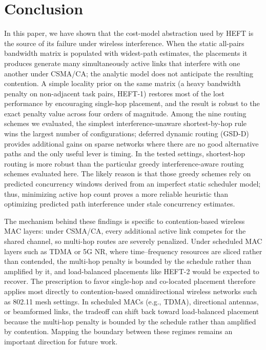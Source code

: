 \documentclass[conference]{IEEEtran}
\newcommand{\heftone}{HEFT-1}
\newcommand{\hefttwo}{HEFT-2}
\begin{document}
\section{Conclusion}
\label{sec:conclusion}

In this paper, we have shown that the cost-model abstraction used by HEFT
is the source of its failure under wireless interference. When the static
all-pairs bandwidth matrix is populated with widest-path estimates, the
placements it produces generate many simultaneously active links that
interfere with one another under CSMA/CA; the analytic model does not
anticipate the resulting contention. A simple
locality prior on the same matrix (a heavy bandwidth penalty on
non-adjacent task pairs, \heftone{}) restores most of the lost
performance by encouraging single-hop placement, and the result is
robust to the exact penalty value across four orders of magnitude.
Among the nine routing schemes we evaluated, the simplest
interference-unaware shortest-by-hop rule wins the largest number of
configurations; deferred dynamic routing (GSD-D) provides additional
gains on sparse networks where there are no good alternative paths and
the only useful lever is timing. In the tested settings, shortest-hop
routing is more robust than the particular greedy interference-aware
routing schemes evaluated here. The likely reason is that those greedy
schemes rely on predicted concurrency windows derived from an imperfect
static scheduler model; thus, minimizing active hop count proves a more
reliable heuristic than optimizing predicted path interference under
stale concurrency estimates.

The mechanism behind these findings is specific to contention-based
wireless MAC layers: under CSMA/CA, every additional active link
competes for the shared channel, so multi-hop routes are severely
penalized.
Under scheduled MAC layers such as TDMA or 5G NR, where time--frequency
resources are sliced rather than contended, the multi-hop penalty is
bounded by the schedule rather than amplified by it, and load-balanced
placements like \hefttwo{} would be expected to recover. The prescription to favor single-hop and co-located placement therefore
applies most directly to contention-based omnidirectional wireless networks
such as 802.11 mesh settings. In scheduled MACs (e.g., TDMA), directional
antennas, or beamformed links, the tradeoff can shift back toward
load-balanced placement because the multi-hop penalty is bounded by the
schedule rather than amplified by contention. Mapping the boundary between
these regimes remains an important direction for future work.
\end{document}
